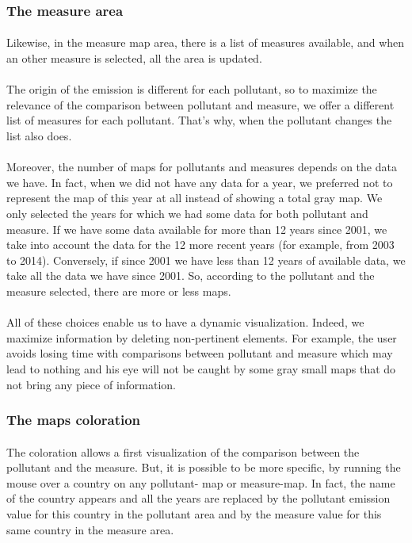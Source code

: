 \documentclass[preprint,journal]{vgtc}       %
\begin{document}
\subsubsection{The measure area}
\paragraph{}
Likewise, in the measure map area, there is a list of measures available, and when an other measure is selected, all the area is updated. 
\paragraph{}
The origin of the emission is different for each pollutant, so to maximize the relevance of the comparison between pollutant and measure, we offer a different list of measures for each pollutant. That’s why, when the pollutant changes the list also does.
\paragraph{}
Moreover, the number of maps for pollutants and measures depends on the data we have. In fact, when we did not have any data for a year, we preferred not to represent the map of this year at all instead of showing a total gray map. We only selected the years for which we had some data for both pollutant and measure. 
\newline
If we have some data available for more than 12 years since 2001, we take into account the data for the 12 more recent years (for example, from 2003 to 2014). Conversely, if since 2001 we have less than 12 years of available data, we take all the data we have since 2001. So, according to the pollutant and the measure selected, there are more or less maps.
\paragraph{}
All of these choices enable us to have a dynamic visualization. Indeed, we maximize information by deleting non-pertinent elements. For example, the user avoids losing time with comparisons between pollutant and measure which may lead to nothing and his eye will not be caught by some gray small maps that do not bring any piece of information.

\subsubsection{The maps coloration}
\paragraph{}
The coloration allows a first visualization of the comparison between the pollutant and the measure. But, it is possible to be more specific, by running the mouse over a country on any pollutant- map or measure-map. 
\newline
In fact, the name of the country appears and all the years are replaced by the pollutant emission value for this country in the pollutant area and by the measure value for this same country in the measure area.
\end{document}
